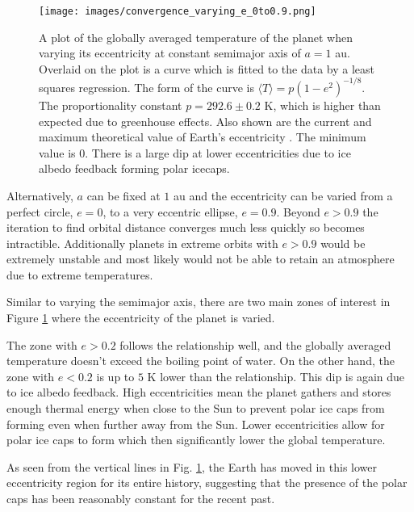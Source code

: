 \documentclass[12pt, onecolumn]{revtex4-2}    %
\begin{document}
\begin{figure}
  \texttt{[image: images/convergence\_varying\_e\_0to0.9.png]}
  \caption{
    A plot of the globally averaged temperature of the planet when varying its eccentricity at constant semimajor axis of $a = 1$ au.
    Overlaid on the plot is a curve which is fitted to the data by a least squares regression.
    The form of the curve is $\langle T \rangle = p(1-e^2)^{-1/8}$.
    The proportionality constant $p = 292.6 \pm 0.2$ K, which is higher than expected due to greenhouse effects.
    Also shown are the current and maximum theoretical value of Earth's eccentricity \cite{LA2010}.
    The minimum value is $0$.
    There is a large dip at lower eccentricities due to ice albedo feedback forming polar icecaps.
  }
  \label{fig:planet_eccentricity}
\end{figure}
Alternatively, $a$ can be fixed at $1$ au and the eccentricity can be varied from a perfect circle, $e = 0$, to a very eccentric ellipse, $e = 0.9$.
Beyond $e > 0.9$ the iteration to find orbital distance converges much less quickly so becomes intractible.
Additionally planets in extreme orbits with $e > 0.9$ would be extremely unstable and most likely would not be able to retain an atmosphere due to extreme temperatures.

Similar to varying the semimajor axis, there are two main zones of interest in Figure \ref{fig:planet_eccentricity} where the eccentricity of the planet is varied.

The zone with $e > 0.2$ follows the relationship well, and the globally averaged temperature doesn't exceed the boiling point of water.
On the other hand, the zone with $e < 0.2$ is up to $5$ K lower than the relationship.
This dip is again due to ice albedo feedback.
High eccentricities mean the planet gathers and stores enough thermal energy when close to the Sun to prevent polar ice caps from forming even when further away from the Sun.
Lower eccentricities allow for polar ice caps to form which then significantly lower the global temperature.

As seen from the vertical lines in Fig. \ref{fig:planet_eccentricity}, the Earth has moved in this lower eccentricity region for its entire history, suggesting that the presence of the polar caps has been reasonably constant for the recent past.

\end{document}
